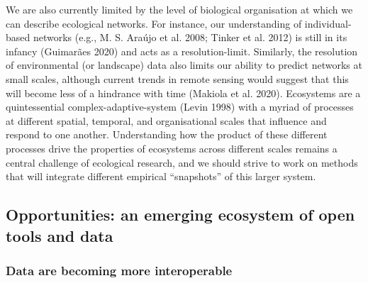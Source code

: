 \documentclass[11pt]{article}
\begin{document}
We are also currently limited by the level of biological organisation at
which we can describe ecological networks. For instance, our
understanding of individual-based networks (e.g., M. S. Araújo et al.
2008; Tinker et al. 2012) is still in its infancy (Guimarães 2020) and
acts as a resolution-limit. Similarly, the resolution of environmental
(or landscape) data also limits our ability to predict networks at small
scales, although current trends in remote sensing would suggest that
this will become less of a hindrance with time (Makiola et al. 2020).
Ecosystems are a quintessential complex-adaptive-system (Levin 1998)
with a myriad of processes at different spatial, temporal, and
organisational scales that influence and respond to one another.
Understanding how the product of these different processes drive the
properties of ecosystems across different scales remains a central
challenge of ecological research, and we should strive to work on
methods that will integrate different empirical ``snapshots'' of this
larger system.

\hypertarget{opportunities-an-emerging-ecosystem-of-open-tools-and-data}{%
\subsection{Opportunities: an emerging ecosystem of open tools and
data}\label{opportunities-an-emerging-ecosystem-of-open-tools-and-data}}

\hypertarget{data-are-becoming-more-interoperable}{%
\subsubsection{Data are becoming more
interoperable}\label{data-are-becoming-more-interoperable}}
\end{document}
